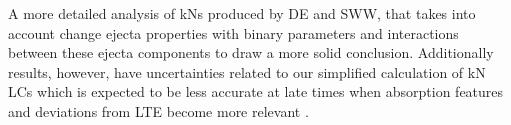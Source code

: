 A more detailed analysis of \acp{kN} produced by \ac{DE} and \ac{SWW}, that 
takes into account change ejecta properties with binary parameters 
and interactions between these ejecta components to draw a more solid conclusion. 
%
Additionally results, however, have uncertainties related to our simplified calculation of
\ac{kN} \acp{LC} which is expected to be less accurate at late times when absorption 
features and deviations from \ac{LTE} become more relevant \citep[see \eg][]{Smartt:2017fuw}.
%

